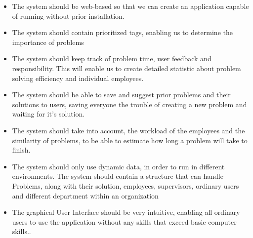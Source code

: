 \begin{itemize}
\item The system should be web-based so that we can create an application capable of running without prior installation.
\item The system should contain prioritized tags, enabling us to determine the importance of problems
\item The system should keep track of problem time, user feedback and responsibility. This will enable us to create detailed statistic about problem solving efficiency and individual employees.
\item The system should be able to save and suggest prior problems and their solutions to users, saving everyone the trouble of creating a new problem and waiting for it's solution.
\item The system should take into account, the workload of the employees and the similarity of problems, to be able to estimate how long a problem will take to finish.
\item The system should only use dynamic data, in order to run in different environments.
\subitem The system should contain a structure that can handle Problems, along with their solution, employees, supervisors, ordinary users and different department within an organization
\item The graphical User Interface should be very intuitive, enabling all ordinary users to use the application without any skills that exceed basic computer skills..
\end{itemize}

